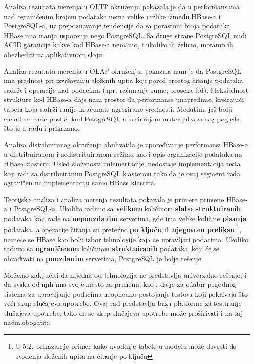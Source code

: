 \documentclass[12pt,oneside]{memoir}
\begin{document}
Analiza rezultata merenja u OLTP okruženju pokazala je da u performansama nad ograničenim brojem podataka nema velike razlike između HBase-a i PostgreSQL-a, uz prepoznavanje tendencije da sa porastom broja podataka HBase ima manja usporenja nego PostgreSQL. Sa druge strane PostgreSQL nudi ACID garancije kakve kod HBase-a nemamo, i ukoliko ih želimo, moramo ih obezbediti na aplikativnom sloju.

Analiza rezultata merenja u OLAP okruženju, pokazala nam je da PostgreSQL ima prednost pri izvršavanju složenih upita koji pored prostog čitanja podataka sadrže i operacije nad podacima (npr. računanje sume, proseka itd). Fleksibilnost strukture kod HBase-a daje nam prostor da performanse unapredimo, kreirajući tabelu koja sadrži ranije izračunate agregirane vrednosti. Međutim, još bolji efekat se može postići kod PostgreSQL-a kreiranjem materijalizovanog pogleda, što je u radu i prikazano.

Analiza distribuiranog okruženja obuhvatila je  upoređivanje performansi HBase-a u distribuiranom i nedistribuiranom režimu kao i opis organizacije podataka na HBase klasteru. Usled složenosti imlementacije, nedostaje implementacija testa koji radi sa distribuiranim PostgreSQL klasterom tako da je ovaj segment rada ograničen na implementaciju samo HBase klastera.


Teorijska analiza i analiza merenja rezultata pokazala je primere primene HBase-a i PostgreSQL-a. Ukoliko radimo sa \textbf{velikom} količinom \textbf{slabo struktuiranih} podataka koji rade na \textbf{nepouzdanim} serverima, gde ima velike količine \textbf{pisanja} podataka, a operacije čitanja su pretežno \textbf{po ključu} ili \textbf{njegovom prefiksu} \footnote{U 5.2. prikazan je primer kako uvođenje tabele u modelu može dovesti do svođenja složenih upita na čitanje po ključu}, nameće se HBase kao bolji izbor tehnologije koja će upravljati podacima. Ukoliko radimo sa \textbf{ograničenom} količinom \textbf{struktuiranih} podataka, koji će se obrađivati na \textbf{pouzdanim} serverima, PostgreSQL je bolje rešenje.

Možemo zaključiti da nijedna od tehnologija ne predstavlja univerzalno rešenje, i da svaka od njih ima svoje mesto za primenu, kao i da je za odabir pogodnog sistema za upravljanje podacima neophodno postojanje testova koji pokrivaju što veći skup slučajeva upotrebe. Ovaj rad predstavlja bazu platforme za testiranje slučajeva upotrebe, tako da se skup slučajeva upotrebe može proširivati i na taj način obogatiti.
\end{document}
